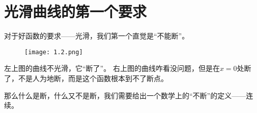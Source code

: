 \section{光滑曲线的第一个要求}

对于好函数的要求——光滑，我们第一个直觉是“不能断”。

\begin{figure}[h]
\centering
\texttt{[image: 1.2.png]}
\end{figure}

左上图的曲线不光滑，它“断了”。
右上图的曲线咋看没问题，但是在$x=0$处断了，不是人为地断，而是这个函数根本到不了断点。

那么什么是断，什么又不是断，我们需要给出一个数学上的“不断”的定义——连续。




